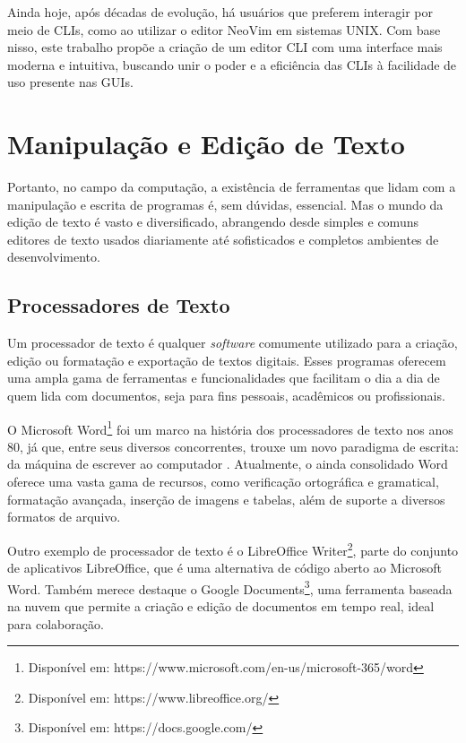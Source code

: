 Ainda hoje, após décadas de evolução, há usuários que preferem interagir por meio
de CLIs, como ao utilizar o editor NeoVim em sistemas UNIX. Com base nisso, este
trabalho propõe a criação de um editor CLI com uma interface mais moderna e
intuitiva, buscando unir o poder e a eficiência das CLIs à facilidade de uso presente
nas GUIs.

\section{Manipulação e Edição de Texto}

Portanto, no campo da computação, a existência de ferramentas que lidam com a
manipulação e escrita de programas é, sem dúvidas, essencial. Mas o mundo da edição
de texto é vasto e diversificado, abrangendo desde simples e comuns editores de
texto usados diariamente até sofisticados e completos ambientes de
desenvolvimento.

\subsection{Processadores de Texto}

Um processador de texto é qualquer \textit{software} comumente utilizado para a
criação, edição ou formatação e exportação de textos digitais. Esses programas
oferecem uma ampla gama de ferramentas e funcionalidades que facilitam o dia a
dia de quem lida com documentos, seja para fins pessoais, acadêmicos ou
profissionais.

O Microsoft Word\footnote{Disponível em: https://www.microsoft.com/en-us/microsoft-365/word}
foi um marco na história dos processadores de texto nos anos 80, já que, entre seus
diversos concorrentes, trouxe um novo paradigma de escrita: da máquina de escrever
ao computador \cite{inbook}. Atualmente, o ainda consolidado Word oferece uma vasta
gama de recursos, como verificação ortográfica e gramatical, formatação avançada,
inserção de imagens e tabelas, além de suporte a diversos formatos de arquivo.

Outro exemplo de processador de texto é o LibreOffice Writer\footnote{Disponível
em: https://www.libreoffice.org/}, parte do conjunto de aplicativos LibreOffice,
que é uma alternativa de código aberto ao Microsoft Word. Também merece destaque
o Google Documents\footnote{Disponível em: https://docs.google.com/}, uma ferramenta
baseada na nuvem que permite a criação e edição de documentos em tempo real,
ideal para colaboração.

